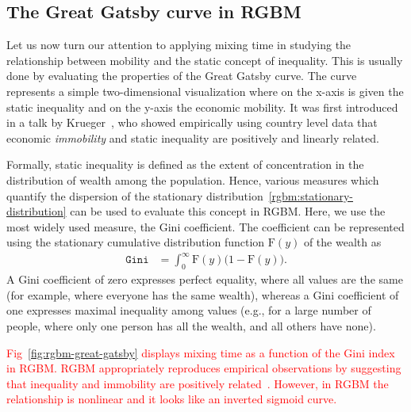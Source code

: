 \documentclass[11pt]{article}
\numberwithin{equation}{section}
\begin{document}
\subsection{The Great Gatsby curve in RGBM}

Let us now turn our attention to applying mixing time in studying the relationship between mobility and the static concept of inequality. This is usually done by evaluating the properties of the Great Gatsby curve. The curve represents a simple two-dimensional visualization where on the x-axis is given the static inequality and on the y-axis the economic mobility. It was first introduced in a talk by Krueger~\cite{krueger2012rise}, who showed empirically using country level data that economic \textit{immobility} and static inequality are  positively and linearly related.

Formally, static inequality is defined as the extent of concentration in the distribution of wealth among the population. Hence, various measures which quantify the dispersion of the stationary distribution~\eqref{rgbm:stationary-distribution} can be used to evaluate this concept in RGBM. Here, we use the most widely used measure, the Gini coefficient. The coefficient can be represented using the stationary cumulative distribution function $\mathrm{F}(y)$ of the wealth as
\begin{align}
\texttt{Gini} &= \int_0^{\infty} \mathrm{F}(y) \bigg( 1 - \mathrm{F}(y) \bigg).
\end{align}
A Gini coefficient of zero expresses perfect equality, where all values are the same (for example, where everyone has the same wealth), whereas a Gini coefficient of one expresses maximal inequality among values (e.g., for a large number of people, where only one person has all the wealth, and all others have none).

\textcolor{red}{Fig~\ref{fig:rgbm-great-gatsby} displays mixing time as a function of the Gini index in RGBM. RGBM appropriately reproduces empirical observations by suggesting that inequality and immobility are positively related~\cite{krueger2012rise}. However, in RGBM the relationship is nonlinear and it looks like an inverted sigmoid curve.}
\end{document}
